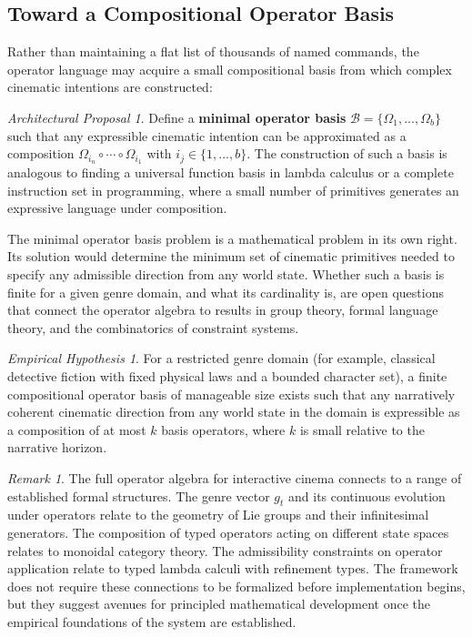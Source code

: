 \documentclass[11pt,a4paper]{article}
\theoremstyle{plain}
\theoremstyle{definition}
\theoremstyle{remark}
\newtheorem{remark}[theorem]{Remark}
\newtheorem{hypothesis}[theorem]{Empirical Hypothesis}
\newtheorem{proposal}[theorem]{Architectural Proposal}
\begin{document}
\subsection{Toward a Compositional Operator Basis}

Rather than maintaining a flat list of thousands of named commands, the operator language may acquire a small compositional basis from which complex cinematic intentions are constructed:

\begin{proposal}
\label{prop:basis}
Define a \textbf{minimal operator basis} $\mathcal{B} = \{\Omega_1, \ldots, \Omega_b\}$ such that any expressible cinematic intention can be approximated as a composition $\Omega_{i_n} \circ \cdots \circ \Omega_{i_1}$ with $i_j \in \{1, \ldots, b\}$. The construction of such a basis is analogous to finding a universal function basis in lambda calculus or a complete instruction set in programming, where a small number of primitives generates an expressive language under composition.
\end{proposal}

The minimal operator basis problem is a mathematical problem in its own right. Its solution would determine the minimum set of cinematic primitives needed to specify any admissible direction from any world state. Whether such a basis is finite for a given genre domain, and what its cardinality is, are open questions that connect the operator algebra to results in group theory, formal language theory, and the combinatorics of constraint systems.

\begin{hypothesis}
\label{hyp:basis}
For a restricted genre domain (for example, classical detective fiction with fixed physical laws and a bounded character set), a finite compositional operator basis of manageable size exists such that any narratively coherent cinematic direction from any world state in the domain is expressible as a composition of at most $k$ basis operators, where $k$ is small relative to the narrative horizon.
\end{hypothesis}

\begin{remark}
The full operator algebra for interactive cinema connects to a range of established formal structures. The genre vector $g_t$ and its continuous evolution under operators relate to the geometry of Lie groups and their infinitesimal generators. The composition of typed operators acting on different state spaces relates to monoidal category theory. The admissibility constraints on operator application relate to typed lambda calculi with refinement types. The framework does not require these connections to be formalized before implementation begins, but they suggest avenues for principled mathematical development once the empirical foundations of the system are established.
\end{remark}
\end{document}
